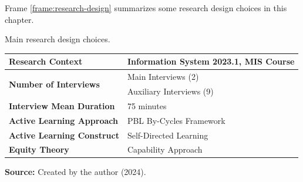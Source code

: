 Frame \ref{frame:research-design} summarizes some research design choices in this chapter.

\begin{quadro}
\caption{Main research design choices.}
\label{frame:research-design}
\centering
\begin{tabular}{|l|l|}
\cline{1-2}

\textbf{Research Context} & 
Information System 2023.1, \gls{MIS} Course \\
\hline

\multirow{2}{*}{\textbf{Number of Interviews}} &
 Main Interviews (2)\\
 & Auxiliary Interviews (9)\\
 \hline
 \textbf{Interview Mean Duration} &
 75 minutes\\
 \hline
 \textbf{Active Learning Approach} &
 PBL By-Cycles Framework \cite{alexandre:2018}\\
 \hline
 \textbf{Active Learning Construct} &
 Self-Directed Learning \cite{knowles:1975,grow:1991}\\
 \hline
 \textbf{Equity Theory} &
 Capability Approach \cite{sen:1992}\\
\hline

\end{tabular}
  \par\medskip\ABNTEXfontereduzida\selectfont\textbf{Source:} Created by the author (2024). \par\medskip
\end{quadro}

                

        
